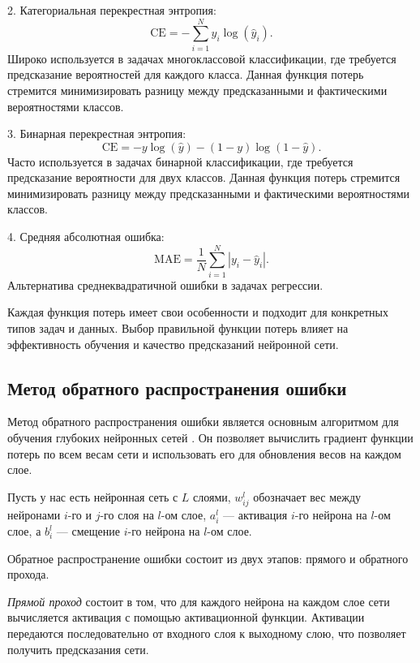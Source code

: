 2. Категориальная перекрестная энтропия:
\begin{equation}
   \text{CE} = -\sum_{i=1}^{N}y_i \log(\hat{y}_i).
\end{equation}
Широко используется в задачах многоклассовой классификации, где требуется предсказание вероятностей для каждого класса. Данная функция потерь стремится минимизировать разницу между предсказанными и фактическими вероятностями классов.

3. Бинарная перекрестная энтропия:
\begin{equation}
   \text{CE} = -y \log(\hat{y}) - (1-y) \log(1-\hat{y}).
\end{equation}
Часто используется в задачах бинарной классификации, где требуется предсказание вероятности для двух классов. Данная функция потерь стремится минимизировать разницу между предсказанными и фактическими вероятностями классов.

4. Средняя абсолютная ошибка:
\begin{equation}
   \text{MAE} = \frac{1}{N}\sum_{i=1}^{N}|y_i - \hat{y}_i|.
\end{equation}
Альтернатива среднеквадратичной ошибки в задачах регрессии.

Каждая функция потерь имеет свои особенности и подходит для конкретных типов задач и данных. Выбор правильной функции потерь влияет на эффективность обучения и качество предсказаний нейронной сети.

\subsection{Метод обратного распространения ошибки}

Метод обратного распространения ошибки является основным алгоритмом для обучения глубоких нейронных сетей \cite{backpropagation}. Он позволяет вычислить градиент функции потерь по всем весам сети и использовать его для обновления весов на каждом слое.

Пусть у нас есть нейронная сеть с \(L\) слоями, \(w_{ij}^l\) обозначает вес между нейронами \(i\)-го и \(j\)-го слоя на \(l\)-ом слое, \(a_i^l\) --- активация \(i\)-го нейрона на \(l\)-ом слое, а \(b_i^l\) --- смещение \(i\)-го нейрона на \(l\)-ом слое.

Обратное распространение ошибки состоит из двух этапов: прямого и обратного прохода.

\textit{Прямой проход} состоит в том, что для каждого нейрона на каждом слое сети вычисляется активация с помощью активационной функции. Активации передаются последовательно от входного слоя к выходному слою, что позволяет получить предсказания сети.

